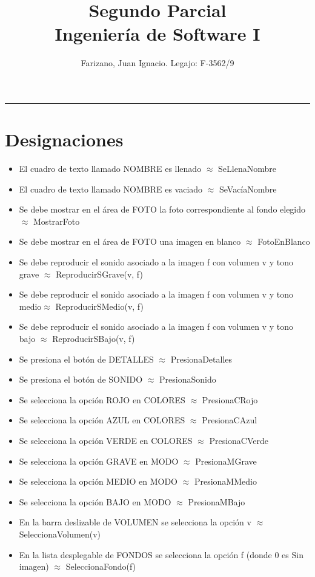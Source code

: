 \documentclass[11pt]{article}
\title{
    Segundo Parcial \\
    \large Ingeniería de Software I}
\author{Farizano, Juan Ignacio. Legajo: F-3562/9}
\date{}
\begin{document}
\maketitle
\rule{\textwidth}{1pt}

\section*{Designaciones}
\begin{itemize}

\item El cuadro de texto llamado NOMBRE es llenado $\approx$ SeLlenaNombre
\item El cuadro de texto llamado NOMBRE es vaciado $\approx$ SeVacíaNombre
\item Se debe mostrar en el área de FOTO la foto correspondiente al fondo elegido $\approx$ MostrarFoto
\item Se debe mostrar en el área de FOTO una imagen en blanco $\approx$ FotoEnBlanco
\item Se debe reproducir el sonido asociado a la imagen f con volumen v y tono grave $\approx$ ReproducirSGrave(v, f)
\item Se debe reproducir el sonido asociado a la imagen f con volumen v y tono medio$\approx$ ReproducirSMedio(v, f)
\item Se debe reproducir el sonido asociado a la imagen f con volumen v y tono bajo $\approx$ ReproducirSBajo(v, f)
\item Se presiona el botón de DETALLES $\approx$ PresionaDetalles
\item Se presiona el botón de SONIDO $\approx$ PresionaSonido
\item Se selecciona la opción ROJO en COLORES $\approx$ PresionaCRojo
\item Se selecciona la opción AZUL en COLORES $\approx$ PresionaCAzul
\item Se selecciona la opción VERDE en COLORES $\approx$ PresionaCVerde
\item Se selecciona la opción GRAVE en MODO $\approx$ PresionaMGrave
\item Se selecciona la opción MEDIO en MODO $\approx$ PresionaMMedio
\item Se selecciona la opción BAJO en MODO $\approx$ PresionaMBajo
\item En la barra deslizable de VOLUMEN se selecciona la opción v $\approx$ SeleccionaVolumen(v)
\item En la lista desplegable de FONDOS se selecciona la opción f (donde 0 es Sin imagen) $\approx$ SeleccionaFondo(f)

\end{itemize}
\end{document}
